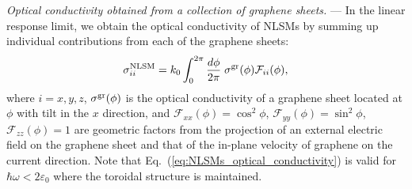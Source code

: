 \documentclass[aps,twocolumn,floatfix]{revtex4-1}
\begin{document}
{\em Optical conductivity obtained from a collection of graphene sheets.} ---
In the linear response limit,
we obtain the optical conductivity of NLSMs by summing up individual contributions from each of the graphene sheets:
\begin{equation}
\label{eq:NLSMs_optical_conductivity}
\sigma_{ii}^{\rm NLSM}
=k_0\int^{2\pi}_{0}\frac{d\phi}{2\pi}\; \sigma^{\rm gr}(\phi) \mathcal{F}_{ii}(\phi),
\end{equation}
where $i=x,y,z$, $\sigma^{\rm gr}(\phi)$ is the optical conductivity of a graphene sheet located at $\phi$ with tilt in the $x$ direction,
and $\mathcal{F}_{xx}(\phi)=\cos^2{\phi}$,
$\mathcal{F}_{yy}(\phi)=\sin^2{\phi}$, $\mathcal{F}_{zz}(\phi)=1$ are geometric factors from the projection of an external electric field on the graphene sheet and that of the in-plane velocity of graphene on the current direction.
Note that Eq.~(\ref{eq:NLSMs_optical_conductivity}) is valid for $\hbar\omega<2\varepsilon_0$ where the toroidal structure is maintained.
\end{document}
